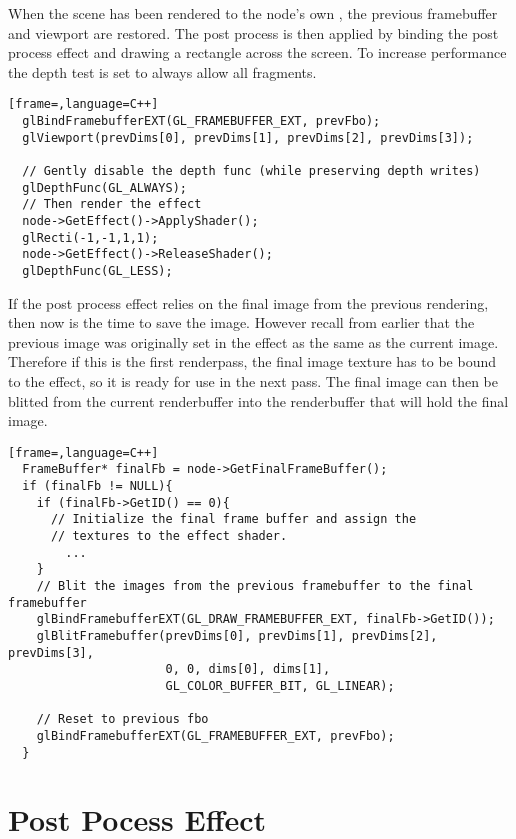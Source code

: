 When the scene has been rendered to the node's own
, the previous framebuffer and viewport are
restored. The post process is then applied by binding the post process
effect and drawing a rectangle across the screen. To increase
performance the depth test is set to always allow all fragments.

\begin{lstlisting}[frame=,language=C++]
  glBindFramebufferEXT(GL_FRAMEBUFFER_EXT, prevFbo);
  glViewport(prevDims[0], prevDims[1], prevDims[2], prevDims[3]);
  
  // Gently disable the depth func (while preserving depth writes)
  glDepthFunc(GL_ALWAYS);
  // Then render the effect
  node->GetEffect()->ApplyShader();
  glRecti(-1,-1,1,1);
  node->GetEffect()->ReleaseShader();
  glDepthFunc(GL_LESS);
\end{lstlisting}


If the post process effect relies on the final image from the previous
rendering, then now is the time to save the image. However recall from
earlier that the previous image was originally set in the effect as
the same as the current image. Therefore if this is the first
renderpass, the final image texture has to be bound to the effect, so
it is ready for use in the next pass. The final image can then be
blitted from the current renderbuffer into the renderbuffer that will
hold the final image.

\begin{lstlisting}[frame=,language=C++]
  FrameBuffer* finalFb = node->GetFinalFrameBuffer();
  if (finalFb != NULL){
    if (finalFb->GetID() == 0){
      // Initialize the final frame buffer and assign the
      // textures to the effect shader.
        ...
    }
    // Blit the images from the previous framebuffer to the final framebuffer
    glBindFramebufferEXT(GL_DRAW_FRAMEBUFFER_EXT, finalFb->GetID());
    glBlitFramebuffer(prevDims[0], prevDims[1], prevDims[2], prevDims[3], 
                      0, 0, dims[0], dims[1], 
                      GL_COLOR_BUFFER_BIT, GL_LINEAR);
    
    // Reset to previous fbo
    glBindFramebufferEXT(GL_FRAMEBUFFER_EXT, prevFbo);
  }
\end{lstlisting}

\section{Post Pocess Effect}

